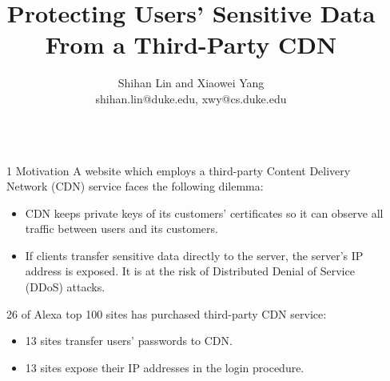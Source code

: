 \documentclass[final]{beamer}
\title{Protecting Users' Sensitive Data From a Third-Party CDN} %
\author{Shihan Lin and Xiaowei Yang \\ shihan.lin@duke.edu, xwy@cs.duke.edu} %
\institute{\Large{Department of Computer Science, Duke University}} %
\newlength{\sepwid}
\newlength{\onecolwid}
\newcommand{\vtopsep}[0]{\vspace{0.2ex}}
\begin{document}

\setlength{\belowcaptionskip}{2ex} %
\setlength\belowdisplayshortskip{2ex} %

\begin{frame}[t] %
																										
	\begin{columns}[t] %
		\begin{column}{\sepwid}\end{column} %
																						        
		\begin{column}{\onecolwid} %
			\begin{block}{1 Motivation}
				A website which employs a third-party Content Delivery Network (CDN) service faces the following dilemma:
				\vtopsep
				\begin{itemize}
					\item CDN keeps private keys of its customers' certificates so it can observe all traffic between users and its customers.
					\item If clients transfer sensitive data directly to the server, the server's IP address is exposed. It is at the risk of Distributed Denial of Service (DDoS) attacks.
				\end{itemize}
				\vtopsep
				26 of Alexa top 100 sites has purchased third-party CDN service:
				\vtopsep
				\begin{itemize}
					\item 13 sites transfer users' passwords to CDN.
					\item 13 sites expose their IP addresses in the login procedure.
				\end{itemize}
				\vtopsep
			\end{block}
																																																            

\end{column}
\end{columns}
\end{frame}
\end{document}

